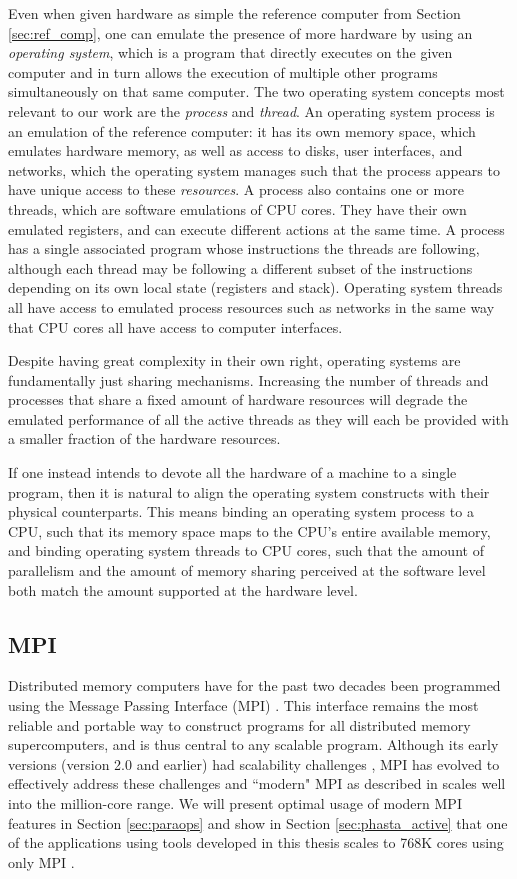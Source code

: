 Even when given hardware as simple the reference
computer from Section \ref{sec:ref_comp}, one can emulate
the presence of more hardware by using an \emph{operating system},
which is a program that directly executes on the given computer
and in turn allows the execution of multiple other programs
simultaneously on that same computer.
The two operating system concepts most relevant to our work
are the \emph{process} and \emph{thread}.
An operating system process is an emulation of the reference computer:
it has its own memory space, which emulates hardware memory,
as well as access to disks, user interfaces, and networks,
which the operating system manages such that the process
appears to have unique access to these \emph{resources}.
A process also contains one or more threads, which are
software emulations of CPU cores.
They have their own emulated registers, and can execute
different actions at the same time.
A process has a single associated program whose instructions
the threads are following, although each thread may be
following a different subset of the instructions depending
on its own local state (registers and stack).
Operating system threads all have access to emulated process
resources such as networks in the same way that CPU cores
all have access to computer interfaces.

Despite having great complexity in their own right, operating
systems are fundamentally just sharing mechanisms.
Increasing the number of threads and processes that share
a fixed amount of hardware resources will degrade the emulated
performance of all the active threads as they will each be
provided with a smaller fraction of the hardware resources.

If one instead intends to devote all the hardware of a machine
to a single program, then it is natural to align the operating
system constructs with their physical counterparts.
This means binding an operating system process to a CPU, such
that its memory space maps to the CPU's entire available memory,
and binding operating system threads to CPU cores, such that
the amount of parallelism and the amount of memory sharing
perceived at the software level both
match the amount supported at the hardware level.

\subsection{MPI}
\label{sec:def_mpi}

Distributed memory computers have for the past two decades
been programmed using the Message Passing Interface (MPI)
\cite{hempel1994mpi,gropp1996mpi}.
This interface remains the most reliable and portable way to construct
programs for all distributed memory supercomputers,
and is thus central to any scalable program.
Although its early versions (version 2.0 and earlier) had
scalability challenges \cite{balaji2009mpi}, MPI has evolved
to effectively address these challenges and ``modern" MPI
as described in \cite{gropp2014using} scales well into the
million-core range.
We will present optimal usage of modern MPI features in
Section \ref{sec:paraops} and show in Section \ref{sec:phasta_active}
that one of the applications using tools developed
in this thesis scales to 768K cores using only MPI \cite{rasquinCise2014}.

